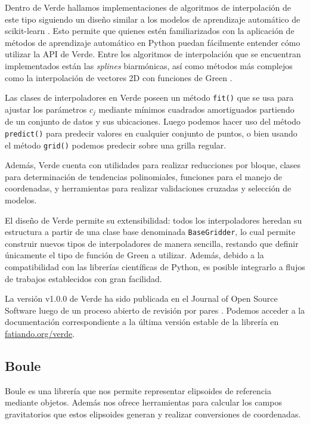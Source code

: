 Dentro de Verde hallamos implementaciones de algoritmos de interpolación de
este tipo siguiendo un diseño similar a los modelos de aprendizaje automático
de scikit-learn \citep{sklearn2011}.
Esto permite que quienes estén familiarizados con la aplicación de métodos de
aprendizaje automático en Python puedan fácilmente entender cómo utilizar la
\ac{API} de Verde.
Entre los algoritmos de interpolación que se encuentran implementados están las
\emph{splines} biarmónicas, así como métodos más complejos como la
interpolación de vectores 2D con funciones de Green \citep{sandwell2016}.

Las clases de interpoladores en Verde poseen un método \texttt{fit()} que se
usa para ajustar los parámetros $c_j$ mediante mínimos cuadrados amortiguados
partiendo de un conjunto de datos y sus ubicaciones.
Luego podemos hacer uso del método \texttt{predict()} para predecir valores en
cualquier conjunto de puntos, o bien usando el método \texttt{grid()} podemos
predecir sobre una grilla regular.

Además, Verde cuenta con utilidades para realizar reducciones por
bloque, clases para determinación de tendencias polinomiales, funciones
para el manejo de coordenadas, y herramientas para realizar validaciones
cruzadas y selección de modelos.

El diseño de Verde permite su extensibilidad: todos los interpoladores
heredan su estructura a partir de una clase base denominada
\texttt{BaseGridder}, lo cual permite construir nuevos tipos de
interpoladores de manera sencilla, restando que definir únicamente el tipo de
función de Green a utilizar.
Además, debido a la compatibilidad con las librerías científicas de Python, es
posible integrarlo a flujos de trabajos establecidos con gran facilidad.

La versión v1.0.0 de Verde ha sido publicada en el Journal of Open
Source Software luego de un proceso abierto de revisión por pares
\citep{verde2018}.
Podemos acceder a la documentación correspondiente a la última versión estable
de la librería en \href{https://www.fatiando.org/verde}{fatiando.org/verde}.


\subsection{Boule}
\label{sec:boule}

Boule es una librería que nos permite representar elipsoides de
referencia mediante objetos. Además nos ofrece herramientas para calcular los
campos gravitatorios que estos elipsoides generan y realizar conversiones
de coordenadas.

